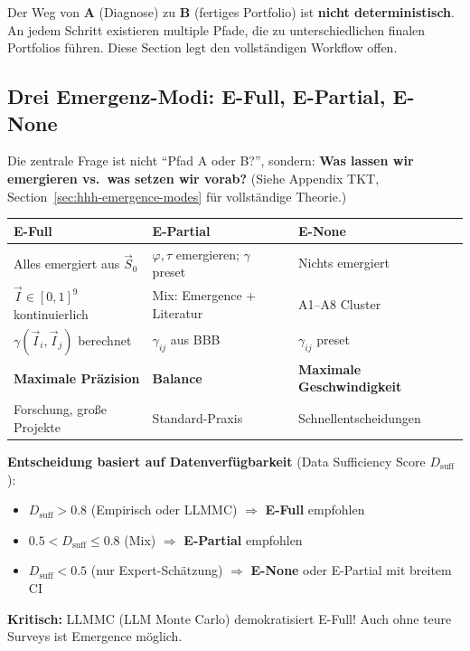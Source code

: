 Der Weg von \textbf{A} (Diagnose) zu \textbf{B} (fertiges Portfolio) ist \textbf{nicht deterministisch}. An jedem Schritt existieren multiple Pfade, die zu unterschiedlichen finalen Portfolios führen. Diese Section legt den vollständigen Workflow offen.

\subsection{Drei Emergenz-Modi: E-Full, E-Partial, E-None}
\label{sec:20-workflow-paths}

\begin{tcolorbox}[colback=red!5!white, colframe=red!75!black,
    title=\textbf{Fundamentale Entscheidung: Welcher Emergenz-Modus?}]

Die zentrale Frage ist nicht ``Pfad A oder B?'', sondern: \textbf{Was lassen wir emergieren vs.\ was setzen wir vorab?} (Siehe Appendix TKT, Section~\ref{sec:hhh-emergence-modes} für vollständige Theorie.)

\begin{center}
\renewcommand{\arraystretch}{1.4}
\begin{tabular}{@{}p{3.5cm}p{4cm}p{4cm}@{}}
\toprule
\textbf{E-Full} & \textbf{E-Partial} & \textbf{E-None} \\
\midrule
Alles emergiert aus $\vec{S}_0$ & $\varphi, \tau$ emergieren; $\gamma$ preset & Nichts emergiert \\
$\vec{I} \in [0,1]^9$ kontinuierlich & Mix: Emergence + Literatur & A1--A8 Cluster \\
$\gamma(\vec{I}_i, \vec{I}_j)$ berechnet & $\gamma_{ij}$ aus BBB & $\gamma_{ij}$ preset \\
\textbf{Maximale Präzision} & \textbf{Balance} & \textbf{Maximale Geschwindigkeit} \\
Forschung, große Projekte & Standard-Praxis & Schnellentscheidungen \\
\bottomrule
\end{tabular}
\end{center}

\textbf{Entscheidung basiert auf Datenverfügbarkeit} (Data Sufficiency Score $D_{\text{suff}}$):
\begin{itemize}[nosep]
\item $D_{\text{suff}} > 0.8$ (Empirisch oder LLMMC) $\Rightarrow$ \textbf{E-Full} empfohlen
\item $0.5 < D_{\text{suff}} \leq 0.8$ (Mix) $\Rightarrow$ \textbf{E-Partial} empfohlen
\item $D_{\text{suff}} < 0.5$ (nur Expert-Schätzung) $\Rightarrow$ \textbf{E-None} oder E-Partial mit breitem CI
\end{itemize}

\textbf{Kritisch:} LLMMC (LLM Monte Carlo) demokratisiert E-Full! Auch ohne teure Surveys ist Emergence möglich.
\end{tcolorbox}

